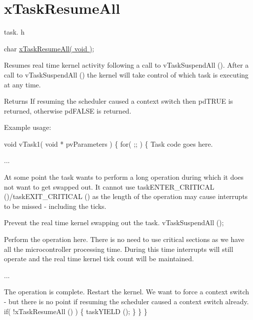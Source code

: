 \hypertarget{group__x_task_resume_all}{\section{x\-Task\-Resume\-All}
\label{group__x_task_resume_all}
}
task. h 
\begin{DoxyPre}char \hyperlink{tasks_8c_ab173f313b22f1a57dfceb98cb01b0508}{xTaskResumeAll( void )};\end{DoxyPre}


Resumes real time kernel activity following a call to v\-Task\-Suspend\-All (). After a call to v\-Task\-Suspend\-All () the kernel will take control of which task is executing at any time.

\begin{DoxyReturn}{Returns}
If resuming the scheduler caused a context switch then pd\-T\-R\-U\-E is returned, otherwise pd\-F\-A\-L\-S\-E is returned.
\end{DoxyReturn}
Example usage\-: 
\begin{DoxyPre}
 void vTask1( void * pvParameters )
 \{
     for( ;; )
     \{
Task code goes here.\end{DoxyPre}



\begin{DoxyPre}...\end{DoxyPre}



\begin{DoxyPre}At some point the task wants to perform a long operation during
which it does not want to get swapped out.  It cannot use
taskENTER\_CRITICAL ()/taskEXIT\_CRITICAL () as the length of the
operation may cause interrupts to be missed - including the
ticks.\end{DoxyPre}



\begin{DoxyPre}Prevent the real time kernel swapping out the task.
         vTaskSuspendAll ();\end{DoxyPre}



\begin{DoxyPre}Perform the operation here.  There is no need to use critical
sections as we have all the microcontroller processing time.
During this time interrupts will still operate and the real
time kernel tick count will be maintained.\end{DoxyPre}



\begin{DoxyPre}...\end{DoxyPre}



\begin{DoxyPre}The operation is complete.  Restart the kernel.  We want to force
a context switch - but there is no point if resuming the scheduler
caused a context switch already.
         if( !xTaskResumeAll () )
         \{
              taskYIELD ();
         \}
     \}
 \}
   \end{DoxyPre}
 